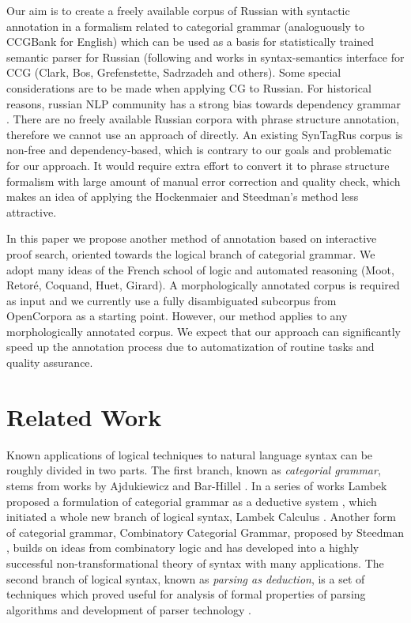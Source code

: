 \documentclass[a4paper]{article}
\theoremstyle{example-style}
\begin{document}
Our aim is to create a freely available corpus of Russian with syntactic annotation in a formalism related to categorial grammar (analoguously to CCGBank for English) which can be used as a basis for statistically trained semantic parser for Russian (following \parencite{clark2007wide} and works in syntax-semantics interface for CCG (Clark, Bos, Grefenstette, Sadrzadeh and others). Some special considerations are to be made when applying CG to Russian. For historical reasons, russian NLP community has a strong bias towards dependency grammar \parencite{toldova2012nlp}. There are no freely available Russian corpora with phrase structure annotation, therefore we cannot use an approach of \parencite{hockenmaier2007ccgbank} directly. An existing SynTagRus corpus \parencite{boguslavsky2002development} is non-free and dependency-based, which is contrary to our goals and problematic for our approach. It would require extra effort to convert it to phrase structure formalism with large amount of manual error correction and quality check, which makes an idea of applying the Hockenmaier and Steedman's method less attractive.
 
In this paper we propose another method of annotation based on interactive proof search, oriented towards the logical branch of categorial grammar. We adopt many ideas of the French school of logic and automated reasoning (Moot, Retor\'{e}, Coquand, Huet, Girard). A morphologically annotated corpus is required as input and we currently use a fully disambiguated subcorpus from OpenCorpora \parencite{granovsky2010opencorpora} as a starting point. However, our method applies to any morphologically annotated corpus. We expect that our approach can significantly speed up the annotation process due to automatization of routine tasks and quality assurance.
     

\section{Related Work}

Known applications of logical techniques to natural language syntax can be roughly divided in two parts. The first branch, known as \textit{categorial grammar}, stems from works by Ajdukiewicz and Bar-Hillel \parencite{ajdukiewicz1935,bar1965language}. In a series of works Lambek proposed a formulation of categorial grammar as a deductive system \parencite{lambek1958mathematics,lambek1961calculus}, which initiated a whole new branch of logical syntax, Lambek Calculus \parencite{moot2012logic}. Another form of categorial grammar, Combinatory Categorial Grammar, proposed by Steedman \parencite{steedman2000syntactic}, builds on ideas from combinatory logic and has developed into a highly successful non-transformational theory of syntax with many applications. The second branch of logical syntax, known as \textit{parsing as deduction}, is a set of techniques which proved useful for analysis of formal properties of parsing algorithms and development of parser technology \parencite{pereira1983parsing,kallmeyer2010parsing}.
\end{document}
